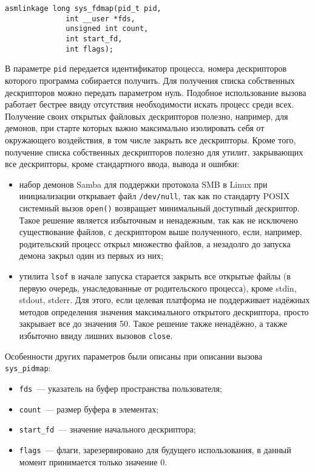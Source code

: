 \medskip
\begin{lstlisting}[style=cstyle]
asmlinkage long sys_fdmap(pid_t pid,
			  int __user *fds,
			  unsigned int count,
			  int start_fd,
			  int flags);
\end{lstlisting}
\medskip

В параметре \texttt{pid} передается идентификатор процесса, номера дескрипторов
которого программа собирается получить. Для получения списка собственных
дескрипторов можно передать параметром нуль. Подобное использование вызова
работает бестрее ввиду отсутствия необходимости искать процесс среди всех.
Получение своих открытых файловых дескрипторов полезно, например, для демонов,
при старте которых важно максимально изолировать себя от окружающего
воздействия, в том числе закрыть все дескрипторы. Кроме того, получение списка
собственных дескрипторов полезно для утилит, закрывающих все дескрипторы, кроме
стандартного ввода, вывода и ошибки:
\begin{itemize}
\item набор демонов Samba для поддержки протокола SMB в Linux при инициализации
  открывает файл \texttt{/dev/null}, так как по стандарту POSIX системный вызов
  \texttt{open()} возвращает минимальный доступный дескриптор. Такое решение
  является избыточным и ненадежным, так как не исключено существование файлов, с
  дескриптором выше полученного, если, например, родительский процесс открыл
  множество файлов, а незадолго до запуска демона закрыл один из первых из них;
\item утилита \texttt{lsof} в начале запуска старается закрыть все открытые
  файлы (в первую очередь, унаследованные от родительского процесса), кроме
  stdin, stdout, stderr. Для этого, если целевая платформа не поддерживает
  надёжных методов определения значения максимального открытого дескриптора,
  просто закрывает все до значения 50. Такое решение также ненадёжно, а также
  избыточно ввиду лишних вызовов \texttt{close}.
\end{itemize}

Особенности других параметров были описаны при описании вызова
\texttt{sys\_pidmap}:
\begin{itemize}
\item \texttt{fds}~--- указатель на буфер пространства пользователя;
\item \texttt{count}~--- размер буфера в элементах;
\item \texttt{start\_fd}~--- значение начального дескриптора;
\item \texttt{flags}~--- флаги, зарезервировано для будущего использования,
  в данный момент принимается только значение 0.
\end{itemize}

